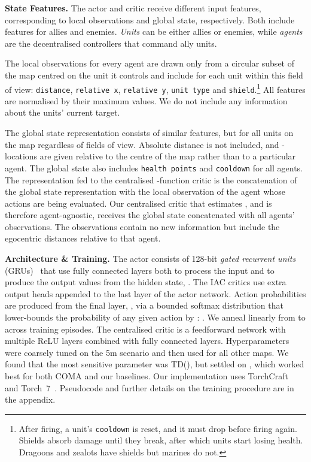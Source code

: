 \documentclass[letterpaper]{article}
\newcommand{\citep}{\cite}
\begin{document}
\textbf{State Features.}
\label{ssec:features}
The actor and critic receive different input features, corresponding to local
observations and global state, respectively. Both include features for allies
and enemies. \emph{Units} can be either allies or enemies, while \emph{agents} are
the decentralised controllers that command ally units.

The local observations for every agent are drawn only from a circular subset of
the map centred on the unit it controls and include for each unit within this 
field of view:
\texttt{distance}, \texttt{relative x}, \texttt{relative
y}, \texttt{unit type} and \texttt{shield}.\footnote{After firing, a unit's 
\texttt{cooldown} is reset, and it must drop
before firing again. Shields absorb damage until they break, after which units
start losing health. Dragoons and zealots have shields but marines do not.}
All features are normalised by their maximum values. We do not include any 
information about the units' current target.

The global state representation consists of similar features, but for
all units on the map regardless of fields of view. Absolute distance is not 
included, and - locations are given relative to the centre of the map 
rather than to a particular agent. The global state also includes 
\texttt{health points} and \texttt{cooldown} for all agents. The representation 
fed
to the centralised -function critic is the concatenation of the global state 
representation with the 
local observation of the agent whose actions are being evaluated. Our 
centralised critic that estimates , 
and is therefore agent-agnostic, receives the global state concatenated with 
all agents' observations. The observations contain no new information but 
include the egocentric distances relative to that agent.

\textbf{Architecture \& Training.}
\label{ssec:architecture} 
The actor consists of 128-bit \emph{gated recurrent units} 
(GRUs)~\citep{cho2014properties} that use fully connected layers both to 
process the input and to produce the output values from the hidden state, 
. The IAC critics use extra output heads appended to the last layer of 
the actor network. Action probabilities are produced from the final layer, 
, via a bounded softmax distribution that lower-bounds the probability of 
any given action by :  . We anneal  linearly from  to  across 
 training episodes. The centralised critic is a feedforward network with 
multiple ReLU layers combined with fully connected layers.  Hyperparameters 
were coarsely tuned on the 5m scenario and then used for all other 
maps. We found that the most sensitive parameter was TD(), but settled 
on , which worked best for both COMA 
and our baselines. Our implementation uses 
TorchCraft~\citep{synnaeve2016torchcraft} and \mbox{Torch 7}~\citep{torch}. Pseudocode and
further details on the training procedure are in the 
appendix.
\end{document}
